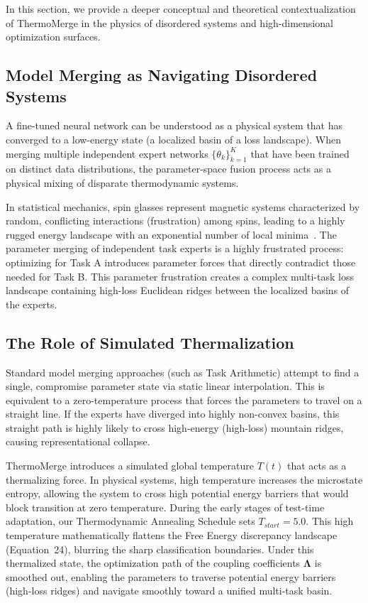 \documentclass{article}
\theoremstyle{plain}
\theoremstyle{definition}
\theoremstyle{remark}
\begin{document}
In this section, we provide a deeper conceptual and theoretical contextualization of ThermoMerge in the physics of disordered systems and high-dimensional optimization surfaces.

\subsection{Model Merging as Navigating Disordered Systems}
A fine-tuned neural network can be understood as a physical system that has converged to a low-energy state (a localized basin of a loss landscape). When merging multiple independent expert networks $\{\theta_k\}_{k=1}^K$ that have been trained on distinct data distributions, the parameter-space fusion process acts as a physical mixing of disparate thermodynamic systems.

In statistical mechanics, spin glasses represent magnetic systems characterized by random, conflicting interactions (frustration) among spins, leading to a highly rugged energy landscape with an exponential number of local minima~\cite{mezard1987spin}. The parameter merging of independent task experts is a highly frustrated process: optimizing for Task A introduces parameter forces that directly contradict those needed for Task B. This parameter frustration creates a complex multi-task loss landscape containing high-loss Euclidean ridges between the localized basins of the experts.

\subsection{The Role of Simulated Thermalization}
Standard model merging approaches (such as Task Arithmetic) attempt to find a single, compromise parameter state via static linear interpolation. This is equivalent to a zero-temperature process that forces the parameters to travel on a straight line. If the experts have diverged into highly non-convex basins, this straight path is highly likely to cross high-energy (high-loss) mountain ridges, causing representational collapse.

ThermoMerge introduces a simulated global temperature $T(t)$ that acts as a thermalizing force. In physical systems, high temperature increases the microstate entropy, allowing the system to cross high potential energy barriers that would block transition at zero temperature. During the early stages of test-time adaptation, our Thermodynamic Annealing Schedule sets $T_{start}=5.0$. This high temperature mathematically flattens the Free Energy discrepancy landscape (Equation~24), blurring the sharp classification boundaries. Under this thermalized state, the optimization path of the coupling coefficients $\boldsymbol{\Lambda}$ is smoothed out, enabling the parameters to traverse potential energy barriers (high-loss ridges) and navigate smoothly toward a unified multi-task basin.
\end{document}
